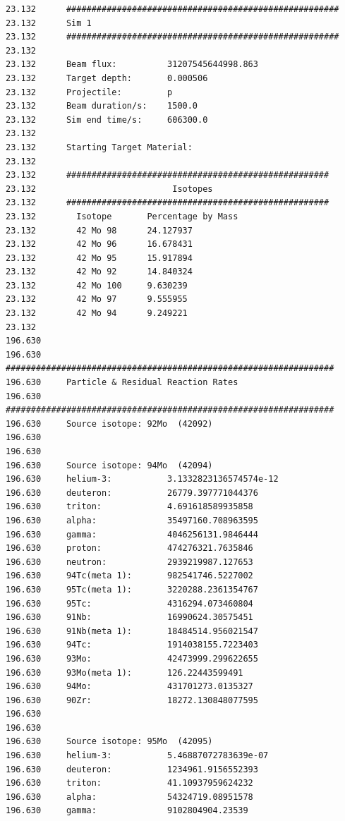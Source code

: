 \begin{lstlisting}[style=sOutputFile,caption={Final results for Molybdenum Irradiation},label={listing:activityv2iron}]
23.132      ######################################################
23.132      Sim 1
23.132      ######################################################
23.132      
23.132      Beam flux:          31207545644998.863
23.132      Target depth:       0.000506
23.132      Projectile:         p
23.132      Beam duration/s:    1500.0
23.132      Sim end time/s:     606300.0
23.132      
23.132      Starting Target Material:
23.132      
23.132      ####################################################
23.132                           Isotopes                       
23.132      ####################################################
23.132        Isotope       Percentage by Mass  
23.132        42 Mo 98      24.127937
23.132        42 Mo 96      16.678431
23.132        42 Mo 95      15.917894
23.132        42 Mo 92      14.840324
23.132        42 Mo 100     9.630239
23.132        42 Mo 97      9.555955
23.132        42 Mo 94      9.249221
23.132        
196.630     
196.630     #################################################################
196.630     Particle & Residual Reaction Rates
196.630     #################################################################
196.630     Source isotope: 92Mo  (42092)
196.630     
196.630     
196.630     Source isotope: 94Mo  (42094)
196.630     helium-3:           3.1332823136574574e-12
196.630     deuteron:           26779.397771044376
196.630     triton:             4.691618589935858
196.630     alpha:              35497160.708963595
196.630     gamma:              4046256131.9846444
196.630     proton:             474276321.7635846
196.630     neutron:            2939219987.127653
196.630     94Tc(meta 1):       982541746.5227002
196.630     95Tc(meta 1):       3220288.2361354767
196.630     95Tc:               4316294.073460804
196.630     91Nb:               16990624.30575451
196.630     91Nb(meta 1):       18484514.956021547
196.630     94Tc:               1914038155.7223403
196.630     93Mo:               42473999.299622655
196.630     93Mo(meta 1):       126.22443599491
196.630     94Mo:               431701273.0135327
196.630     90Zr:               18272.130848077595
196.630     
196.630     
196.630     Source isotope: 95Mo  (42095)
196.630     helium-3:           5.46887072783639e-07
196.630     deuteron:           1234961.9156552393
196.630     triton:             41.10937959624232
196.630     alpha:              54324719.08951578
196.630     gamma:              9102804904.23539

\end{lstlisting}
